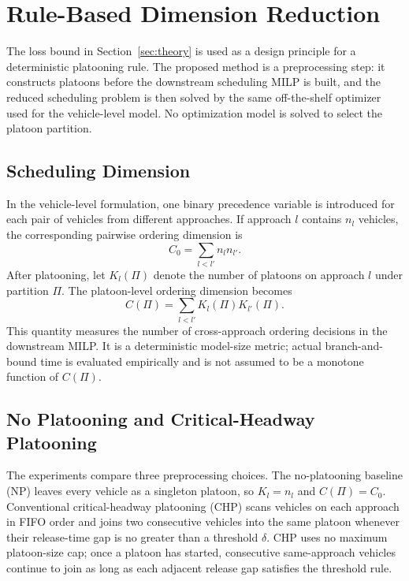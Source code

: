 \section{Rule-Based Dimension Reduction}
\label{sec:dimension-reduction}

The loss bound in Section~\ref{sec:theory} is used as a design principle for a deterministic platooning rule. The proposed method is a preprocessing step: it constructs platoons before the downstream scheduling MILP is built, and the reduced scheduling problem is then solved by the same off-the-shelf optimizer used for the vehicle-level model. No optimization model is solved to select the platoon partition.

\subsection{Scheduling Dimension}
\label{sec:scheduling-dimension}

In the vehicle-level formulation, one binary precedence variable is introduced for each pair of vehicles from different approaches. If approach \(l\) contains \(n_l\) vehicles, the corresponding pairwise ordering dimension is
\begin{equation}
C_0=\sum_{l<l'} n_l n_{l'}.
\end{equation}
After platooning, let \(K_l(\Pi)\) denote the number of platoons on approach \(l\) under partition \(\Pi\). The platoon-level ordering dimension becomes
\begin{equation}
C(\Pi)=\sum_{l<l'} K_l(\Pi)K_{l'}(\Pi).
\label{eq:dimension-measure}
\end{equation}
This quantity measures the number of cross-approach ordering decisions in the downstream MILP. It is a deterministic model-size metric; actual branch-and-bound time is evaluated empirically and is not assumed to be a monotone function of \(C(\Pi)\).

\subsection{No Platooning and Critical-Headway Platooning}
\label{sec:np-chp-rules}

The experiments compare three preprocessing choices. The no-platooning baseline (NP) leaves every vehicle as a singleton platoon, so \(K_l=n_l\) and \(C(\Pi)=C_0\). Conventional critical-headway platooning (CHP) scans vehicles on each approach in FIFO order and joins two consecutive vehicles into the same platoon whenever their release-time gap is no greater than a threshold \(\delta\). CHP uses no maximum platoon-size cap; once a platoon has started, consecutive same-approach vehicles continue to join as long as each adjacent release gap satisfies the threshold rule.

